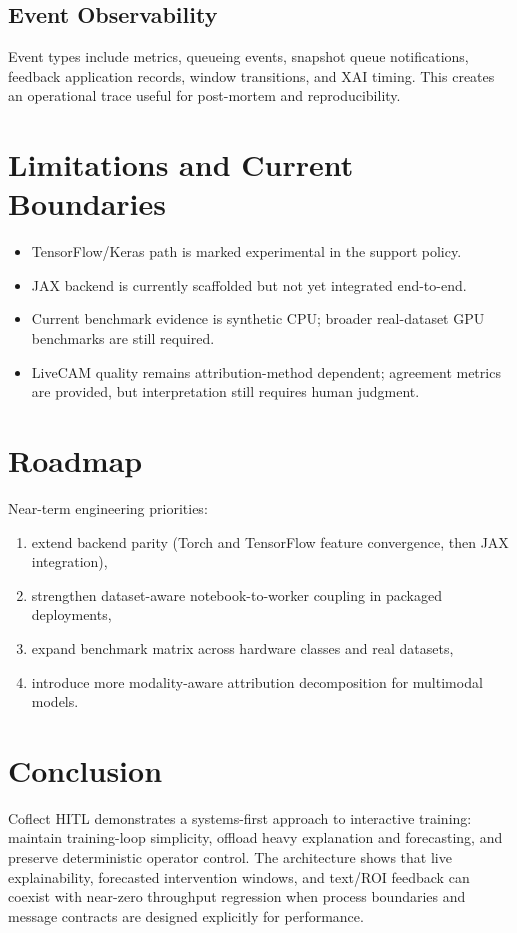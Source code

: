 \documentclass[11pt]{article}
\begin{document}
\subsection{Event Observability}
Event types include metrics, queueing events, snapshot queue notifications, feedback application records, window transitions, and XAI timing.
This creates an operational trace useful for post-mortem and reproducibility.

\section{Limitations and Current Boundaries}
\begin{itemize}[leftmargin=1.5em]
  \item TensorFlow/Keras path is marked experimental in the support policy.
  \item JAX backend is currently scaffolded but not yet integrated end-to-end.
  \item Current benchmark evidence is synthetic CPU; broader real-dataset GPU benchmarks are still required.
  \item LiveCAM quality remains attribution-method dependent; agreement metrics are provided, but interpretation still requires human judgment.
\end{itemize}

\section{Roadmap}
Near-term engineering priorities:
\begin{enumerate}[leftmargin=1.5em]
  \item extend backend parity (Torch and TensorFlow feature convergence, then JAX integration),
  \item strengthen dataset-aware notebook-to-worker coupling in packaged deployments,
  \item expand benchmark matrix across hardware classes and real datasets,
  \item introduce more modality-aware attribution decomposition for multimodal models.
\end{enumerate}

\section{Conclusion}
Coflect HITL demonstrates a systems-first approach to interactive training: maintain training-loop simplicity, offload heavy explanation and forecasting, and preserve deterministic operator control.
The architecture shows that live explainability, forecasted intervention windows, and text/ROI feedback can coexist with near-zero throughput regression when process boundaries and message contracts are designed explicitly for performance.



\end{document}
